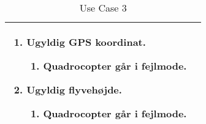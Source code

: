 \begin{table}[H]
\begin{tabular}{| p{3cm}| p{11.5cm}|}
									\renewcommand{\labelenumi}{\Roman{enumi}:}
									\renewcommand{\labelenumii}{\alph{enumii})}
									\begin{enumerate}[topsep=0.0cm,leftmargin=0.5cm]
										\item Ugyldig GPS koordinat.
											\begin{enumerate}[topsep=0cm, leftmargin=1cm]
												\item Quadrocopter går i fejlmode.
											\end{enumerate}
										\item Ugyldig flyvehøjde.
											\begin{enumerate}[topsep=0cm, leftmargin=1cm]
												\item Quadrocopter går i fejlmode.
											\end{enumerate}
									\end{enumerate} \\\hline	

\end{tabular}
\caption{Use Case 3}
\label{tab:UC3}
\end{table}